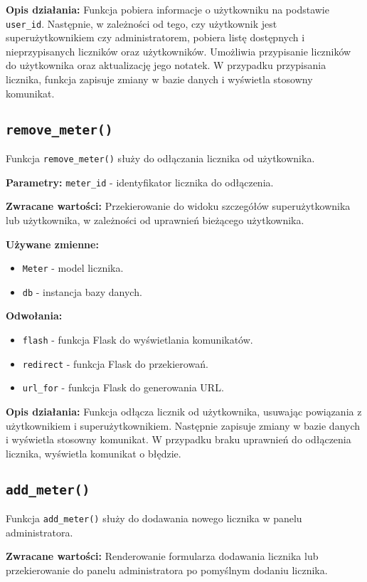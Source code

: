 \documentclass[12pt,a4paper]{report}
\begin{document}
\textbf{Opis działania:}
Funkcja pobiera informacje o użytkowniku na podstawie \texttt{user\_id}. Następnie, w zależności od tego, czy użytkownik jest superużytkownikiem czy administratorem, pobiera listę dostępnych i nieprzypisanych liczników oraz użytkowników. Umożliwia przypisanie liczników do użytkownika oraz aktualizację jego notatek. W przypadku przypisania licznika, funkcja zapisuje zmiany w bazie danych i wyświetla stosowny komunikat.
\subsection{\texttt{remove\_meter()}}
\label{sec:remove_meter}
Funkcja \texttt{remove\_meter()} służy do odłączania licznika od użytkownika.

\textbf{Parametry:} \texttt{meter\_id} - identyfikator licznika do odłączenia.

\textbf{Zwracane wartości:} Przekierowanie do widoku szczegółów superużytkownika lub użytkownika, w zależności od uprawnień bieżącego użytkownika.

\textbf{Używane zmienne:}
\begin{itemize}
    \item \texttt{Meter} - model licznika.
    \item \texttt{db} - instancja bazy danych.
\end{itemize}

\textbf{Odwołania:}
\begin{itemize}
    \item \texttt{flash} - funkcja Flask do wyświetlania komunikatów.
    \item \texttt{redirect} - funkcja Flask do przekierowań.
    \item \texttt{url\_for} - funkcja Flask do generowania URL.
\end{itemize}

\textbf{Opis działania:}
Funkcja odłącza licznik od użytkownika, usuwając powiązania z użytkownikiem i superużytkownikiem. Następnie zapisuje zmiany w bazie danych i wyświetla stosowny komunikat. W przypadku braku uprawnień do odłączenia licznika, wyświetla komunikat o błędzie.

\subsection{\texttt{add\_meter()}}
\label{sec:add_meter}
Funkcja \texttt{add\_meter()} służy do dodawania nowego licznika w panelu administratora.

\textbf{Zwracane wartości:} Renderowanie formularza dodawania licznika lub przekierowanie do panelu administratora po pomyślnym dodaniu licznika.
\end{document}
